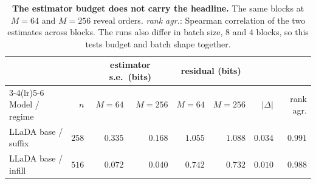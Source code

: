 \begin{table}[!ht]
\centering
\footnotesize
\setlength{\tabcolsep}{4.5pt}
\begin{tabular}{lrrrrrrr}
\toprule
 & & \multicolumn{2}{c}{estimator s.e.\ (bits)} & \multicolumn{2}{c}{residual (bits)} & & \\
\cmidrule(lr){3-4}\cmidrule(lr){5-6}
Model / regime & $n$ & $M{=}64$ & $M{=}256$ & $M{=}64$ & $M{=}256$ & $|\Delta|$ & rank agr. \\
\midrule
LLaDA base / suffix & $258$ & $0.335$ & $0.168$ & $1.055$ & $1.088$ & $0.034$ & $0.991$ \\
LLaDA base / infill & $516$ & $0.072$ & $0.040$ & $0.742$ & $0.732$ & $0.010$ & $0.988$ \\
\bottomrule
\end{tabular}
\caption{\textbf{The estimator budget does not carry the headline.} The same blocks at
$M{=}64$ and $M{=}256$ reveal orders. \emph{rank agr.}:
Spearman correlation of the two estimates across blocks. The runs also differ in batch
size, $8$ and $4$ blocks, so this tests budget and batch shape together.}\label{tab:msens}
\end{table}
